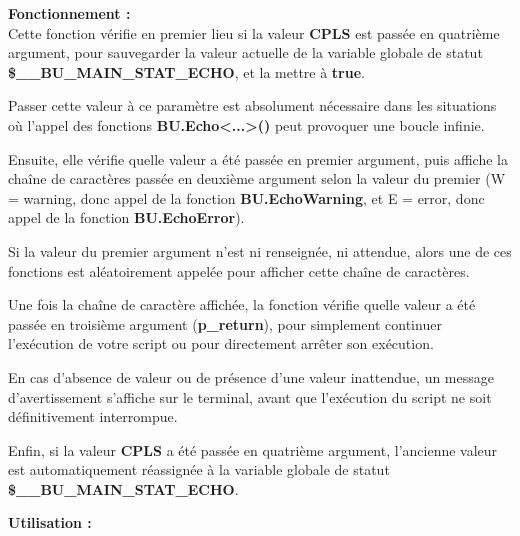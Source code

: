 \documentclass[a4paper,10pt]{article}
\begin{document}
\begin{justify}
    \textbf{Fonctionnement :}\\
    Cette fonction vérifie en premier lieu si la valeur \textbf{CPLS} est passée en quatrième argument, pour sauvegarder la valeur actuelle de la variable globale de statut \textbf{\color{orange}\$\_\_BU\_MAIN\_STAT\_ECHO}, et la mettre à \textbf{true}.
\end{justify}

\begin{justify}
    Passer cette valeur à ce paramètre est absolument nécessaire dans les situations où l'appel des fonctions \textbf{\color{mauve}BU.Echo<...>()} peut provoquer une boucle infinie.
\end{justify}

\begin{justify}
    Ensuite, elle vérifie quelle valeur a été passée en premier argument, puis affiche la chaîne de caractères passée en deuxième argument selon la valeur du premier (W = warning, donc appel de la fonction \textbf{\color{mauve}BU.EchoWarning}, et E = error, donc appel de la fonction \textbf{\color{mauve}BU.EchoError}).
\end{justify}

\begin{justify}
    Si la valeur du premier argument n'est ni renseignée, ni attendue, alors une de ces fonctions est aléatoirement appelée pour afficher cette chaîne de caractères.
\end{justify}

\begin{justify}
    Une fois la chaîne de caractère affichée, la fonction vérifie quelle valeur a été passée en troisième argument (\textbf{\color{orange}p\_return}), pour simplement continuer l'exécution de votre script ou pour directement arrêter son exécution.
\end{justify}

\begin{justify}
    En cas d'absence de valeur ou de présence d'une valeur inattendue, un message d'avertissement s'affiche sur le terminal, avant que l'exécution du script ne soit définitivement interrompue.
\end{justify}

\begin{justify}
    Enfin, si la valeur \textbf{CPLS} a été passée en quatrième argument, l'ancienne valeur est automatiquement réassignée à la variable globale de statut \textbf{\color{orange}\$\_\_BU\_MAIN\_STAT\_ECHO}.
\end{justify}

\begin{justify}
    \textbf{Utilisation :}
\end{justify}
\end{document}
